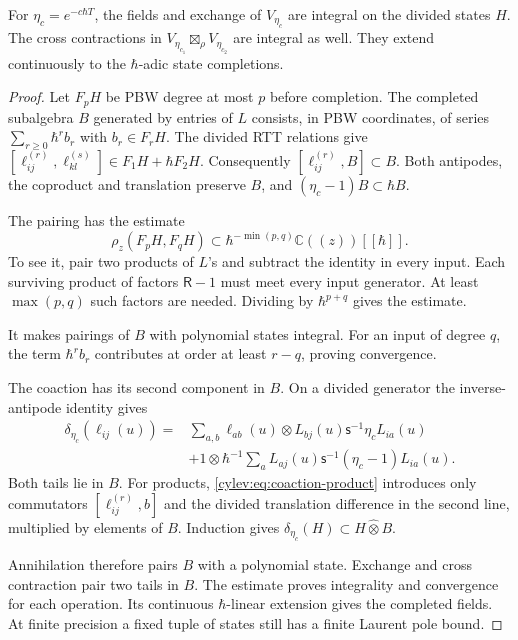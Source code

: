 \begin{lemma}\label{cylev:lem:integrality}
For $\eta_c=e^{-c\hbar T}$, the fields and exchange of $V_{\eta_c}$
are integral on the divided states $H$.
The cross contractions in
$V_{\eta_{c_1}}\boxtimes_\rho V_{\eta_{c_2}}$ are integral as well.
They extend continuously to the $\hbar$-adic state completions.
\end{lemma}
\begin{proof}
Let $F_pH$ be PBW degree at most $p$ before completion.
The completed subalgebra $B$ generated by entries of $L$ consists,
in PBW coordinates, of series
$\sum_{r\geq0}\hbar^rb_r$ with $b_r\in F_rH$.
The divided RTT relations give
$[\ell_{ij}^{(r)},\ell_{kl}^{(s)}]\in F_1H+\hbar F_2H$.
Consequently $[\ell_{ij}^{(r)},B]\subset B$.
Both antipodes, the coproduct and translation preserve $B$, and
$(\eta_c-1)B\subset\hbar B$.

The pairing has the estimate
\begin{equation}\label{cylev:eq:degree-estimate}
 \rho_z(F_pH,F_qH)
       \subset\hbar^{-\min(p,q)}\mathbb C((z))[[\hbar]].
\end{equation}
To see it, pair two products of $L$'s and subtract the identity
in every input. Each surviving product of factors $\mathsf R-1$
must meet every input generator. At least $\max(p,q)$ such factors
are needed. Dividing by $\hbar^{p+q}$ gives the estimate.

It makes pairings of $B$ with polynomial states integral.
For an input of degree $q$, the term $\hbar^rb_r$ contributes
at order at least $r-q$, proving convergence.

The coaction has its second component in $B$.
On a divided generator the inverse-antipode identity gives
\begin{equation}\label{cylev:eq:integral-coaction}
\begin{split}
 \delta_{\eta_c}(\ell_{ij}(u))
 ={}&\sum_{a,b}\ell_{ab}(u)\otimes
                  L_{bj}(u)\mathsf s^{-1}\eta_cL_{ia}(u)\\
 &+1\otimes\hbar^{-1}\sum_aL_{aj}(u)
                  \mathsf s^{-1}(\eta_c-1)L_{ia}(u).
\end{split}
\end{equation}
Both tails lie in $B$.
For products, \eqref{cylev:eq:coaction-product} introduces only
commutators $[\ell_{ij}^{(r)},b]$ and the divided translation
difference in the second line, multiplied by elements of $B$.
Induction gives $\delta_{\eta_c}(H)\subset H\widehat\otimes B$.

Annihilation therefore pairs $B$ with a polynomial state.
Exchange and cross contraction pair two tails in $B$.
The estimate proves integrality and convergence for each operation.
Its continuous $\hbar$-linear extension gives the completed fields.
At finite precision a fixed tuple of states still has a finite
Laurent pole bound.
\end{proof}


